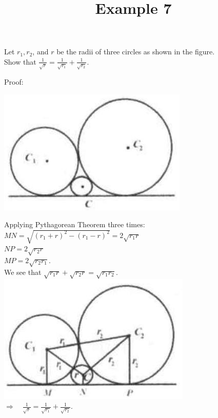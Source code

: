 \documentclass{article}
\title{Example 7}
\date{}
\begin{document}
\maketitle

Let \(r_{1}, r_{2}\), and \(r\) be the radii of three circles as shown in the figure.\\
Show that \(\frac{1}{\sqrt{r}}=\frac{1}{\sqrt{r_{1}}}+\frac{1}{\sqrt{r_{2}}}\).

Proof:
\begin{center}
\includegraphics[width=\textwidth]{images/problem_image_1.jpg}
\end{center}

Applying Pythagorean Theorem three times:\\
\(M N=\sqrt{\left(r_{1}+r\right)^{2}-\left(r_{1}-r\right)^{2}}=2 \sqrt{r_{1} r}\)\\
\(N P=2 \sqrt{r_{2} r}\)\\
\(M P=2 \sqrt{r_{2} r_{1}}\).\\
We see that \(\sqrt{r_{1} r}+\sqrt{r_{2} r}=\sqrt{r_{1} r_{2}}\).\\
\centering
\includegraphics[width=\textwidth]{images/reasoning_image_1.jpg}\\
\(\Rightarrow \quad \frac{1}{\sqrt{r}}=\frac{1}{\sqrt{r_{1}}}+\frac{1}{\sqrt{r_{2}}}\).
\end{document}

